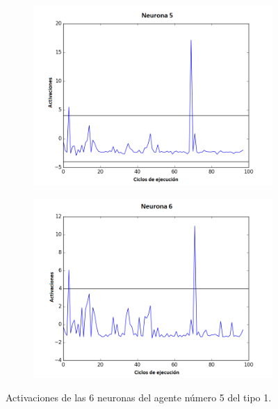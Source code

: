 \begin{figure}[!h]
\begin{subfigure}{0.33\textwidth}
  \includegraphics[width=\linewidth]{Imagenes/Agente1Activaciones/Agente4/Neurona4}
\end{subfigure}\hfil %
\begin{subfigure}{0.33\textwidth}
  \includegraphics[width=\linewidth]{Imagenes/Agente1Activaciones/Agente4/Neurona5}
\end{subfigure}
\caption{Activaciones de las 6 neuronas del agente número 5 del tipo 1.}
\end{figure}
